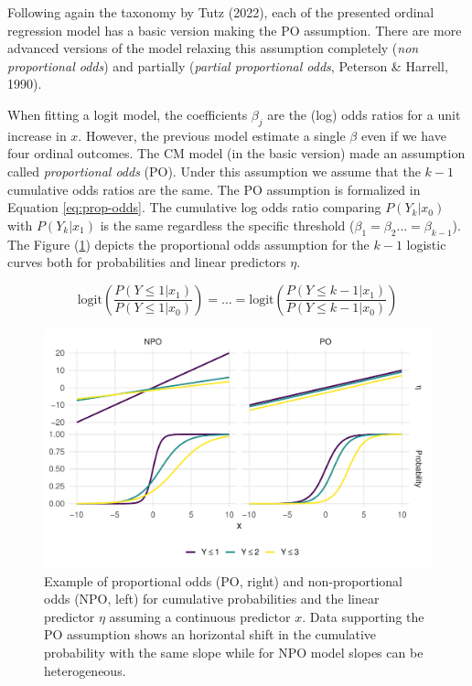 \documentclass[
  man,floatsintext]{apa6}
\begin{document}
Following again the taxonomy by Tutz (2022), each of the presented ordinal regression model has a basic version making the PO assumption. There are more advanced versions of the model relaxing this assumption completely (\emph{non proportional odds}) and partially (\emph{partial proportional odds}, Peterson \& Harrell, 1990).

When fitting a logit model, the coefficients \(\beta_j\) are the (log) odds ratios for a unit increase in \(x\). However, the previous model estimate a single \(\beta\) even if we have four ordinal outcomes. The CM model (in the basic version) made an assumption called \emph{proportional odds} (PO). Under this assumption we assume that the \(k - 1\) cumulative odds ratios are the same. The PO assumption is formalized in Equation \eqref{eq:prop-odds}. The cumulative log odds ratio comparing \(P(Y_k|x_0)\) with \(P(Y_k|x_1)\) is the same regardless the specific threshold (\(\beta_1 = \beta_2 \dots = \beta_{k - 1}\)). The Figure (\ref{fig:fig-prop-odds}) depicts the proportional odds assumption for the \(k - 1\) logistic curves both for probabilities and linear predictors \(\eta\).

\begin{equation}
\text{logit} (\frac{P(Y \leq 1 |x_1)}{P(Y \leq 1 |x_0)}) = \dots = \text{logit} (\frac{P(Y \leq k - 1 |x_1)}{P(Y \leq k -1 |x_0)})
\label{eq:prop-odds}
\end{equation}

\scriptsize

\begin{figure}

{\centering \includegraphics[width=1\linewidth]{paper_files/figure-latex/fig-prop-odds-1} 

}

\caption{Example of proportional odds (PO, right) and non-proportional odds (NPO, left) for cumulative probabilities and the linear predictor \(\eta\) assuming a continuous predictor \(x\). Data supporting the PO assumption shows an horizontal shift in the cumulative probability with the same slope while for NPO model slopes can be heterogeneous.}\label{fig:fig-prop-odds}
\end{figure}
\end{document}
